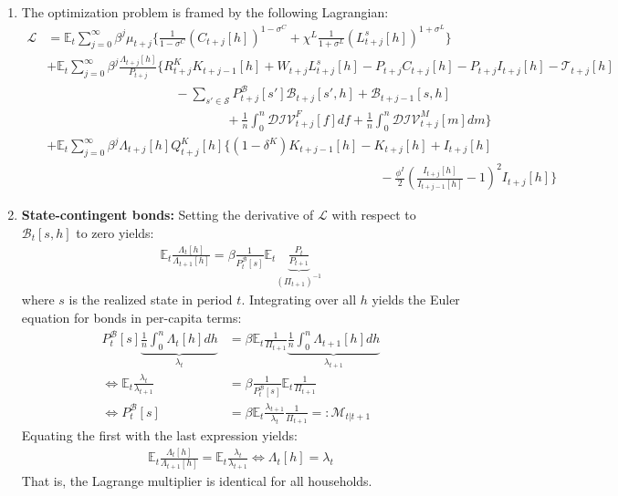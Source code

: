 \begin{enumerate}

\item
The optimization problem is framed by the following Lagrangian:
\begin{align*}
\mathcal{L} &= \mathbb{E}_{t} \sum_{j=0}^{\infty} \beta^{j} \mu_{t+j} \Bigg \{
  \frac{1}{1-\sigma^{C}} {(C_{t+j}[h])}^{1-\sigma^{C}}
  +\chi^{L} \frac{1}{1+\sigma^{L}} {(L^{s}_{t+j}[h])}^{1+\sigma^{L}}
  \Bigg \}
\\
&+ \mathbb{E}_{t} \sum_{j=0}^{\infty} \beta^{j} \frac{\Lambda_{t+j}[h]}{P_{t+j}} \Bigg \{
  R^{K}_{t+j} K_{t+j-1}[h]
+ W_{t+j} L^{s}_{t+j}[h]
- P_{t+j} C_{t+j}[h] - P_{t+j} I_{t+j}[h]
- \mathcal{T}_{t+j}[h]
\\
&\qquad\qquad\qquad\qquad\qquad
- \sum_{s' \in \mathcal{S}} P^{\mathcal{B}}_{t+j}[s'] \mathcal{B}_{t+j}[s',h]
+ \mathcal{B}_{t+j-1}[s,h]
\\
&\qquad\qquad\qquad\qquad\qquad\qquad\qquad
+ \frac{1}{n} \int_{0}^{n} \mathcal{DIV}^{F}_{t+j}[f] df
+ \frac{1}{n} \int_{0}^{n} \mathcal{DIV}^{M}_{t+j}[m] dm
\Bigg \}
\\
&+ \mathbb{E}_{t} \sum_{j=0}^{\infty} \beta^{j} \Lambda_{t+j}[h] Q^{K}_{t+j}[h] \Bigg \{
(1-\delta^{K}) K_{t+j-1}[h]  - K_{t+j}[h] + I_{t+j}[h] 
\\
&\qquad\qquad\qquad\qquad\qquad\qquad\qquad\qquad\qquad\qquad\qquad\qquad\qquad
- \frac{\phi^{I}}{2} {\left(\frac{I_{t+j}[h]}{I_{t+j-1}[h]} - 1 \right)}^2 I_{t+j}[h]
\Bigg \}
\end{align*}

\item
\textbf{State-contingent bonds:} Setting the derivative of \(\mathcal{L}\) with respect to \(\mathcal{B}_{t}[s,h]\) to zero yields:
\begin{align*}
\mathbb{E}_{t} \frac{\Lambda_{t}[h]}{\Lambda_{t+1}[h]} = \beta \frac{1}{P^{\mathcal{B}}_{t}[s]} \mathbb{E}_{t} \underbrace{\frac{P_{t}}{P_{t+1}}}_{{(\Pi_{t+1})}^{-1}}
\end{align*}
where \(s\) is the realized state in period \(t\).
Integrating over all \(h\) yields the Euler equation for bonds in per-capita terms:
\begin{align*}
P^{\mathcal{B}}_{t}[s] \underbrace{\frac{1}{n} \int_{0}^{n} \Lambda_{t}[h] dh}_{\lambda_{t}}  &= \beta \mathbb{E}_{t} \frac{1}{\Pi_{t+1}} \underbrace{\frac{1}{n}\int_{0}^{n} \Lambda_{t+1}[h] dh}_{\lambda_{t+1}}
\\
\Leftrightarrow
\mathbb{E}_{t} \frac{\lambda_{t}}{\lambda_{t+1}} &= \beta \frac{1}{P^{\mathcal{B}}_{t}[s]} \mathbb{E}_{t} \frac{1}{\Pi_{t+1}}
\\
\Leftrightarrow
P^{\mathcal{B}}_{t}[s] &= \beta \mathbb{E}_{t} \frac{\lambda_{t+1}}{\lambda_{t}} \frac{1}{\Pi_{t+1}} =: \mathcal{M}_{t|t+1}
\end{align*}
Equating the first with the last expression yields:
\begin{gather*}
\mathbb{E}_{t} \frac{\Lambda_{t}[h]}{\Lambda_{t+1}[h]} = \mathbb{E}_{t} \frac{\lambda_{t}}{\lambda_{t+1}}
\Leftrightarrow
\Lambda_{t}[h] = \lambda_{t}
\end{gather*}
That is, the Lagrange multiplier is identical for all households.


\end{enumerate}
